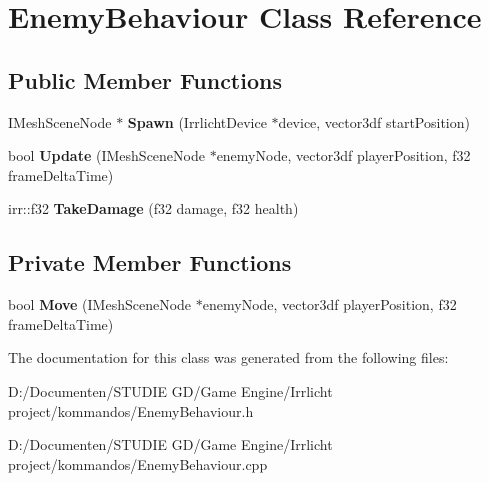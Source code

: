 \hypertarget{class_enemy_behaviour}{}\section{Enemy\+Behaviour Class Reference}
\label{class_enemy_behaviour}
\subsection*{Public Member Functions}
\begin{DoxyCompactItemize}
\item 
\mbox{\label{class_enemy_behaviour_ab939353a2a71b7845ab189c513428261}} 
I\+Mesh\+Scene\+Node $\ast$ {\bfseries Spawn} (Irrlicht\+Device $\ast$device, vector3df start\+Position)
\item 
\mbox{\label{class_enemy_behaviour_a1d0bb3932590897b6cd466c5ad3c75b0}} 
bool {\bfseries Update} (I\+Mesh\+Scene\+Node $\ast$enemy\+Node, vector3df player\+Position, f32 frame\+Delta\+Time)
\item 
\mbox{\label{class_enemy_behaviour_a05ba9053c7919726d4521ccc271df0ea}} 
irr\+::f32 {\bfseries Take\+Damage} (f32 damage, f32 health)
\end{DoxyCompactItemize}
\subsection*{Private Member Functions}
\begin{DoxyCompactItemize}
\item 
\mbox{\label{class_enemy_behaviour_ae9579b2147baa156496e618e7d1ae6cb}} 
bool {\bfseries Move} (I\+Mesh\+Scene\+Node $\ast$enemy\+Node, vector3df player\+Position, f32 frame\+Delta\+Time)
\end{DoxyCompactItemize}


The documentation for this class was generated from the following files\+:\begin{DoxyCompactItemize}
\item 
D\+:/\+Documenten/\+S\+T\+U\+D\+I\+E G\+D/\+Game Engine/\+Irrlicht project/kommandos/Enemy\+Behaviour.\+h\item 
D\+:/\+Documenten/\+S\+T\+U\+D\+I\+E G\+D/\+Game Engine/\+Irrlicht project/kommandos/Enemy\+Behaviour.\+cpp\end{DoxyCompactItemize}
